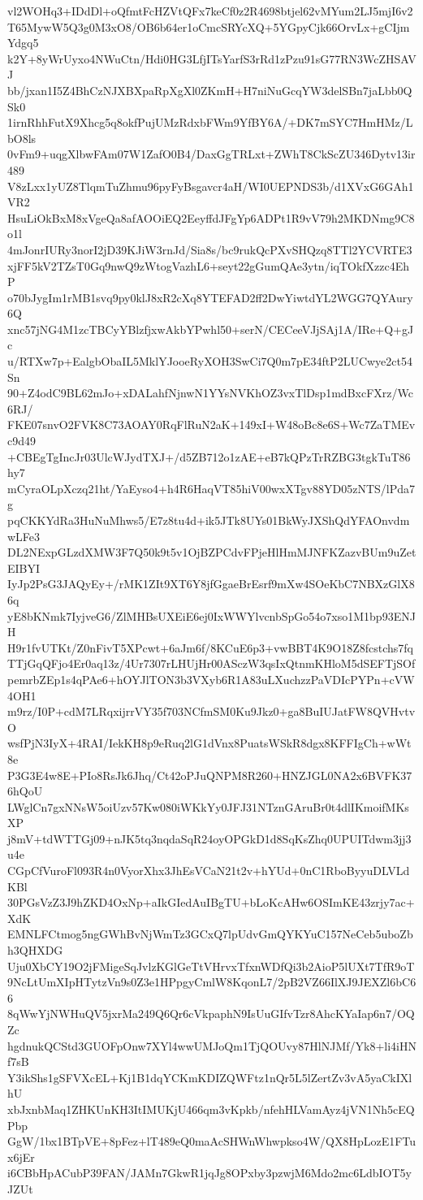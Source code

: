 vl2WOHq3+IDdDl+oQfmtFcHZVtQFx7keCf0z2R4698btjel62vMYum2LJ5mjI6v2
T65MywW5Q3g0M3xO8/OB6b64er1oCmcSRYcXQ+5YGpyCjk66OrvLx+gCIjmYdgq5
k2Y+8yWrUyxo4NWuCtn/Hdi0HG3LfjITsYarfS3rRd1zPzu91sG77RN3WcZHSAVJ
bb/jxan1I5Z4BhCzNJXBXpaRpXgXl0ZKmH+H7niNuGcqYW3delSBn7jaLbb0QSk0
1irnRhhFutX9Xhcg5q8okfPujUMzRdxbFWm9YfBY6A/+DK7mSYC7HmHMz/LbO8ls
0vFm9+uqgXlbwFAm07W1ZafO0B4/DaxGgTRLxt+ZWhT8CkScZU346Dytv13ir489
V8zLxx1yUZ8TlqmTuZhmu96pyFyBsgavcr4aH/WI0UEPNDS3b/d1XVxG6GAh1VR2
HsuLiOkBxM8xVgeQa8afAOOiEQ2EeyffdJFgYp6ADPt1R9vV79h2MKDNmg9C8o1l
4mJonrIURy3norI2jD39KJiW3rnJd/Sia8s/bc9rukQcPXvSHQzq8TTl2YCVRTE3
xjFF5kV2TZsT0Gq9nwQ9zWtogVazhL6+seyt22gGumQAe3ytn/iqTOkfXzzc4EhP
o70bJygIm1rMB1svq9py0klJ8xR2cXq8YTEFAD2ff2DwYiwtdYL2WGG7QYAury6Q
xnc57jNG4M1zcTBCyYBlzfjxwAkbYPwhl50+serN/CECeeVJjSAj1A/IRe+Q+gJc
u/RTXw7p+EalgbObaIL5MklYJooeRyXOH3SwCi7Q0m7pE34ftP2LUCwye2ct54Sn
90+Z4odC9BL62mJo+xDALahfNjnwN1YYsNVKhOZ3vxTlDsp1mdBxcFXrz/Wc6RJ/
FKE07snvO2FVK8C73AOAY0RqFlRuN2aK+149xI+W48oBc8e6S+Wc7ZaTMEvc9d49
+CBEgTgIncJr03UlcWJydTXJ+/d5ZB712o1zAE+eB7kQPzTrRZBG3tgkTuT86hy7
mCyraOLpXczq21ht/YaEyso4+h4R6HaqVT85hiV00wxXTgv88YD05zNTS/lPda7g
pqCKKYdRa3HuNuMhws5/E7z8tu4d+ik5JTk8UYs01BkWyJXShQdYFAOnvdmwLFe3
DL2NExpGLzdXMW3F7Q50k9t5v1OjBZPCdvFPjeHlHmMJNFKZazvBUm9uZetEIBYI
IyJp2PsG3JAQyEy+/rMK1ZIt9XT6Y8jfGgaeBrEsrf9mXw4SOeKbC7NBXzGlX86q
yE8bKNmk7IyjveG6/ZlMHBsUXEiE6ej0IxWWYlvcnbSpGo54o7xso1M1bp93ENJH
H9r1fvUTKt/Z0nFivT5XPcwt+6aJm6f/8KCuE6p3+vwBBT4K9O18Z8fcstchs7fq
TTjGqQFjo4Er0aq13z/4Ur7307rLHUjHr00ASczW3qsIxQtnmKHloM5dSEFTjSOf
pemrbZEp1s4qPAe6+hOYJlTON3b3VXyb6R1A83uLXuchzzPaVDIcPYPn+cVW4OH1
m9rz/I0P+cdM7LRqxijrrVY35f703NCfmSM0Ku9Jkz0+ga8BuIUJatFW8QVHvtvO
wsfPjN3IyX+4RAI/IekKH8p9eRuq2lG1dVnx8PuatsWSkR8dgx8KFFIgCh+wWt8e
P3G3E4w8E+PIo8RsJk6Jhq/Ct42oPJuQNPM8R260+HNZJGL0NA2x6BVFK376hQoU
LWglCn7gxNNsW5oiUzv57Kw080iWKkYy0JFJ31NTznGAruBr0t4dlIKmoifMKsXP
j8mV+tdWTTGj09+nJK5tq3nqdaSqR24oyOPGkD1d8SqKsZhq0UPUITdwm3jj3u4e
CGpCfVuroFl093R4n0VyorXhx3JhEsVCaN21t2v+hYUd+0nC1RboByyuDLVLdKBl
30PGsVzZ3J9hZKD4OxNp+aIkGIedAuIBgTU+bLoKcAHw6OSImKE43zrjy7ac+XdK
EMNLFCtmog5ngGWhBvNjWmTz3GCxQ7lpUdvGmQYKYuC157NeCeb5uboZbh3QHXDG
Uju0XbCY19O2jFMigeSqJvlzKGlGeTtVHrvxTfxnWDfQi3b2AioP5lUXt7TfR9oT
9NcLtUmXIpHTytzVn9s0Z3e1HPpgyCmlW8KqonL7/2pB2VZ66IlXJ9JEXZl6bC66
8qWwYjNWHuQV5jxrMa249Q6Qr6cVkpaphN9IsUuGIfvTzr8AhcKYaIap6n7/OQZc
hgdnukQCStd3GUOFpOnw7XYl4wwUMJoQm1TjQOUvy87HlNJMf/Yk8+li4iHNf7sB
Y3ikShs1gSFVXcEL+Kj1B1dqYCKmKDIZQWFtz1nQr5L5lZertZv3vA5yaCkIXlhU
xbJxnbMaq1ZHKUnKH3ItIMUKjU466qm3vKpkb/nfehHLVamAyz4jVN1Nh5cEQPbp
GgW/1bx1BTpVE+8pFez+lT489eQ0maAcSHWnWhwpkso4W/QX8HpLozE1FTux6jEr
i6CBbHpACubP39FAN/JAMn7GkwR1jqJg8OPxby3pzwjM6Mdo2mc6LdbIOT5yJZUt
